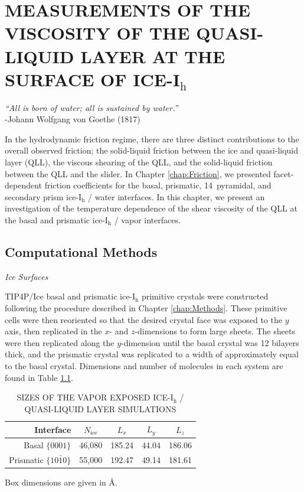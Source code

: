 \chapter{MEASUREMENTS OF THE VISCOSITY OF THE QUASI-LIQUID LAYER AT THE SURFACE OF ICE-I$_\mathrm{h}$}\label{chap:QLL}

\begin{flushright}
\textit{``All is born of water; all is sustained by water.''} \\
-Johann Wolfgang von Goethe (1817) \\
\end{flushright}

In the hydrodynamic friction regime, there are three distinct
contributions to the overall observed friction; the solid-liquid
friction between the ice and quasi-liquid layer (QLL), the viscous
shearing of the QLL, and the solid-liquid friction between the QLL and
the slider.\cite{Kietzig2009,Kietzig2010} In Chapter
\ref{chap:Friction}, we presented facet-dependent friction
coefficients for the basal, prismatic, 14\degree~pyramidal, and
secondary prism ice-I$_\mathrm{h}$ / water interfaces. In this
chapter, we present an investigation of the temperature dependence of
the shear viscosity of the QLL at the basal and prismatic
ice-I$_\mathrm{h}$ / vapor interfaces.



\section{Computational Methods}

\begin{flushleft}
\textit{Ice Surfaces}
\end{flushleft}

TIP4P/Ice basal and prismatic ice-I$_\mathrm{h}$ primitive crystals
were constructed following the procedure described in Chapter
\ref{chap:Methods}. These primitive cells were then reoriented so that
the desired crystal face was exposed to the $y$ axis, then replicated
in the $x$- and $z$-dimensions to form large sheets. The sheets were
then replicated along the $y$-dimension until the basal crystal was 12
bilayers thick, and the prismatic crystal was replicated to a width of
approximately equal to the basal crystal. Dimensions and number of
molecules in each system are found in Table \ref{tab:qll-method}.


\begin{table}[h]
\centering
\caption{SIZES OF THE VAPOR EXPOSED ICE-I$_\mathrm{h}$ / QUASI-LIQUID LAYER SIMULATIONS\label{tab:qll-method}}
\begin{tabular}{rcccc}
\hline
\hline
 Interface & $N_\mathrm{ice}$ & $L_x$ & $L_y$ & $L_z$ \\
\hline
Basal  $\{0001\}$                           & 46,080 & 185.24 & 44.04 & 186.06 \\
Prismatic  $\{10\bar{1}0\}$            & 55,000 & 192.47 & 49.14 & 181.61\\
\hline
\hline
\end{tabular}
\begin{flushleft}
Box dimensions are given in \AA.
\end{flushleft}
\end{table}


